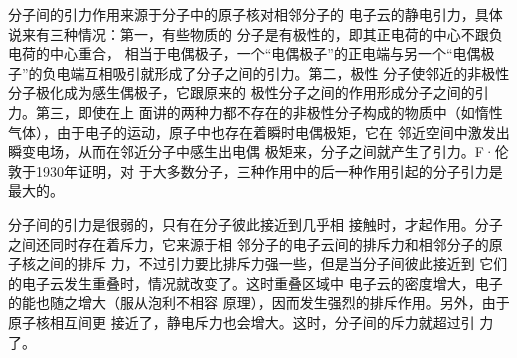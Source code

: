 分子间的引力作用来源于分子中的原子核对相邻分子的
电子云的静电引力，具体说来有三种情况：第一，有些物质的
分子是有极性的，即其正电荷的中心不跟负电荷的中心重合，
相当于电偶极子，一个“电偶极子”的正电端与另一个“电偶极
子”的负电端互相吸引就形成了分子之间的引力。第二，极性
分子使邻近的非极性分子极化成为感生偶极子，它跟原来的
极性分子之间的作用形成分子之间的引力。第三，即使在上
面讲的两种力都不存在的非极性分子构成的物质中（如惰性
气体），由于电子的运动，原子中也存在着瞬时电偶极矩，它在
邻近空间中激发出瞬变电场，从而在邻近分子中感生出电偶
极矩来，分子之间就产生了引力。F·伦敦于1930年证明，对
于大多数分子，三种作用中的后一种作用引起的分子引力是
最大的。

分子间的引力是很弱的，只有在分子彼此接近到几乎相
接触时，才起作用。分子之间还同时存在着斥力，它来源于相
邻分子的电子云间的排斥力和相邻分子的原子核之间的排斥
力，不过引力要比排斥力强一些，但是当分子间彼此接近到
它们的电子云发生重叠时，情况就改变了。这时重叠区域中
电子云的密度增大，电子的能也随之增大（服从泡利不相容
原理），因而发生强烈的排斥作用。另外，由于原子核相互间更
接近了，静电斥力也会增大。这时，分子间的斥力就超过引
力了。































